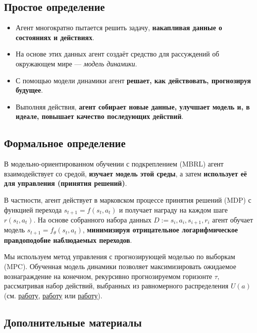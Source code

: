 \documentclass[11pt,a4paper]{article}
\begin{document}
\subsection{Простое определение}\label{simple-definition}

\begin{itemize}
\item
  Агент многократно пытается решить задачу, \textbf{накапливая данные о состояниях и действиях}.
\item
  На основе этих данных агент создаёт средство для рассуждений об окружающем мире --- \emph{модель динамики}.
\item
  С помощью модели динамики агент \textbf{решает, как действовать, прогнозируя будущее}.
\item
  Выполняя действия, \textbf{агент собирает новые данные, улучшает модель и, в идеале, повышает качество последующих действий}.
\end{itemize}

\subsection{Формальное определение}\label{academic-definition}

В модельно-ориентированном обучении с подкреплением (MBRL) агент взаимодействует со средой, \textbf{изучает модель этой среды}, а затем \textbf{использует её для управления (принятия решений)}.

В частности, агент действует в марковском процессе принятия решений (MDP) с функцией перехода \(s_{t+1} = f (s_t , a_t)\) и получает награду на каждом шаге \(r(s_t, a_t)\). На основе собранного набора данных \(D :={ s_i, a_i, s_{i+1}, r_i}\) агент обучает модель \(s_{t+1} = f_\theta (s_t , a_t)\), \textbf{минимизируя отрицательное логарифмическое правдоподобие наблюдаемых переходов}.

Мы используем метод управления с прогнозирующей моделью по выборкам (MPC). Обученная модель динамики позволяет максимизировать ожидаемое вознаграждение на конечном, рекурсивно прогнозируемом горизонте \(\tau\), рассматривая набор действий, выбранных из равномерного распределения \(U(a)\) (см. \href{https://arxiv.org/pdf/2002.04523}{работу}, \href{https://arxiv.org/pdf/2012.09156.pdf}{работу} или \href{https://arxiv.org/pdf/2009.01221.pdf}{работу}).

\subsection{Дополнительные материалы}\label{further-reading-1}
\end{document}
